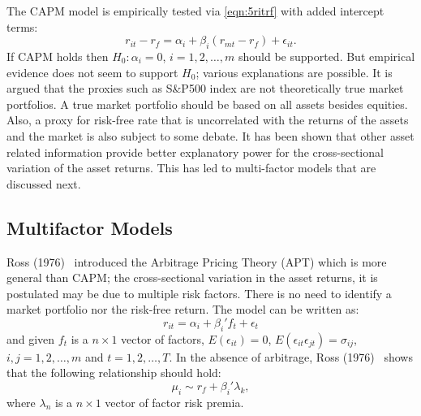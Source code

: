 The CAPM model is empirically tested via \eqref{eqn:5ritrf} with added intercept terms:
	\begin{equation}\label{eqn:intercept}
	r_{it} - r_f = \alpha_i + \beta_i (r_{mt} - r_f) + \epsilon_{it}.
	\end{equation}
If CAPM holds then $H_0: \alpha_i=0$, $i=1,2,\ldots,m$ should be supported. But empirical evidence does not seem to support $H_0$; various explanations are possible. It is argued that the proxies such as S\&P500 index are not theoretically true market portfolios. A true market portfolio should be based on all assets besides equities. Also, a proxy for risk-free rate that is uncorrelated with the returns of the assets and the market is also subject to some debate. It has been shown that other asset related information provide better explanatory power for the cross-sectional variation of the asset returns. This has led to multi-factor models that are discussed next. 


\subsection{Multifactor Models}

Ross (1976)~\cite{rossarb} introduced the Arbitrage Pricing Theory (APT) which is more general than CAPM; the cross-sectional variation in the asset returns, it is postulated may be due to multiple risk factors. There is no need to identify a market portfolio nor the risk-free return. The model can be written as:
	\begin{equation}\label{eqn:arbrit}
	r_{it} = \alpha_i + \beta_i' f_t + \epsilon_t
	\end{equation}
and given $f_t$ is a $n \times 1$ vector of factors, $E(\epsilon_{it})=  0$, $E(\epsilon_{it}\epsilon_{jt})= \sigma_{ij}$, $i,j= 1, 2, \ldots, m$ and $t= 1, 2, \ldots, T$. In the absence of arbitrage, Ross (1976)~\cite{rossarb} shows that the following relationship should hold:
	\begin{equation} \label{eqn:mewirf}
	\mu_i \sim r_f + \beta_i' \lambda_k,
	\end{equation}
where $\lambda_n$ is a $n \times 1$ vector of factor risk premia.


